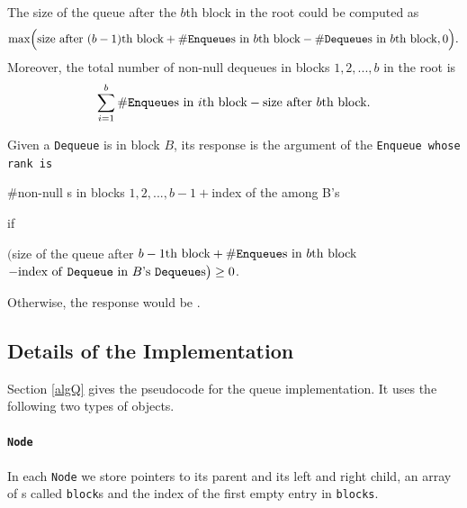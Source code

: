 \noindent The size of the queue after the $b$th block in the root
could be computed as 
$$\textrm{max}\Big(\textrm{size after }(b-1)\textrm{th block} +
\#\textrm{\tt{Enqueue}s in }b\textrm{th block} -
\#\textrm{\tt{Dequeue}s in }b\textrm{th block}, 0\Big).$$ 
\noindent Moreover, the total number of non-null dequeues in blocks
$1,2,...,b$ in the root is 
$$ \sum_{i=1}^{b} \#\textrm{\tt{Enqueue}s in }i\textrm{th block} -
\textrm{size after }b\textrm{th block}.$$ 

Given a \texttt{Dequeue} is in block $B$, its response is the argument
of the \tt{Enqueue} whose rank is 
\begin{center}
    \#\textrm{non-null } s in  blocks $1,2,...,b-1 +  $index of the  among B\textrm{'s} 
\end{center}
if \vspace{-3em}
\begin{center}
    $\big ($size of the queue after $b-1\textrm{th block} + \#\textrm{\tt{Enqueue}s in }b\textrm{th block} $\\$- \textrm{index of \tt{Dequeue} in }B\textrm{'s \tt{Dequeue}s} \big )\geq 0$.
\end{center}
Otherwise, the response would be .


\subsection{Details of the Implementation}
Section \ref{algQ} gives the pseudocode for the queue
implementation. It uses the following two types of objects. 
\paragraph{\tt{Node}} 
 In each \texttt{Node} we store pointers to its parent and its left
 and right child, an array of s called \texttt{block}s and
 the index  of the first empty entry in \texttt{blocks}. 

